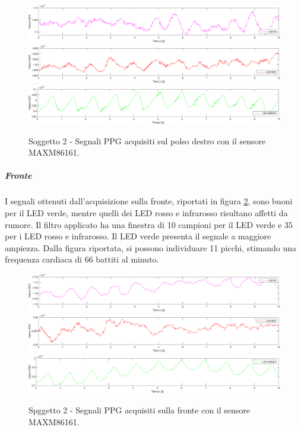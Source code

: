 \begin{figure}[h]
	\centering
	\includegraphics[width=1\linewidth]{ImageFiles/Misure Preliminari/Soggetto 2/maxm86161/polso_inferiore_ir_moving_avg}
	\includegraphics[width=1\linewidth]{ImageFiles/Misure Preliminari/Soggetto 2/maxm86161/polso_inferiore_red_moving_avg}
	\includegraphics[width=1\linewidth]{ImageFiles/Misure Preliminari/Soggetto 2/maxm86161/polso_inferiore_green_moving_avg}
	\caption{Soggetto 2 - Segnali PPG acquisiti sul polso destro con il sensore MAXM86161.}
	\label{fig:soggetto2_MAXM86161_polso}
\end{figure}

\clearpage

\subparagraph{Fronte}
I segnali ottenuti dall'acquisizione sulla fronte, riportati in figura \ref{fig:soggetto2_MAXM86161_fronte}, sono buoni per il LED verde, mentre quelli dei LED rosso e infrarosso risultano affetti da rumore. Il filtro applicato ha una finestra di 10 campioni per il LED verde e 35 per i LED rosso e infrarosso. Il LED verde presenta il segnale a maggiore ampiezza. Dalla figura riportata, si possono individuare 11 picchi, stimando una frequenza cardiaca di 66 battiti al minuto.

\begin{figure}[h]
	\centering
	\includegraphics[width=1\linewidth]{ImageFiles/Misure Preliminari/Soggetto 2/maxm86161/fronte_ir_moving_avg}
	\includegraphics[width=1\linewidth]{ImageFiles/Misure Preliminari/Soggetto 2/maxm86161/fronte_red_moving_avg}
	\includegraphics[width=1\linewidth]{ImageFiles/Misure Preliminari/Soggetto 2/maxm86161/fronte_green_moving_avg}
	\caption{Spggetto 2 - Segnali PPG acquisiti sulla fronte con il sensore MAXM86161.}
	\label{fig:soggetto2_MAXM86161_fronte}
\end{figure}


\clearpage